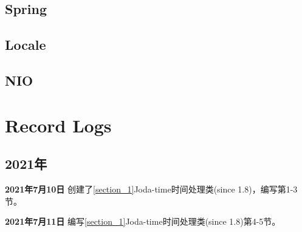 \documentclass[cn,10pt,math=newtx,citestyle=gb7714-2015,bibstyle=gb7714-2015]{elegantbook}
\begin{document}
    \section{Spring}

    \section{Locale}

    \section{NIO}



    \chapter{Record Logs}

    \section{2021年}

    \textbf{2021年7月10日} 创建了\ref{section_1}Joda-time时间处理类(since 1.8)，编写第1-3节。
    
    \textbf{2021年7月11日} 编写\ref{section_1}Joda-time时间处理类(since 1.8)第4-5节。
    
\end{document}
